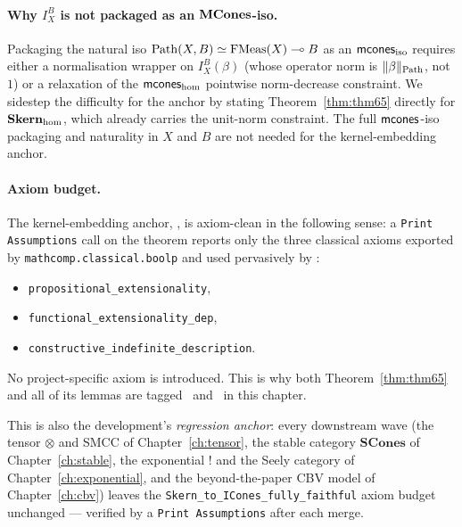 \paragraph{Why \texorpdfstring{$I^B_X$}{I^B_X} is not packaged as an \texorpdfstring{$\mathbf{MCones}$}{MCones}-iso.}
Packaging the natural iso $\mathrm{Path}(X, B) \simeq \mathrm{FMeas}(X) \multimap B$ as an
$\mathsf{mcones}_{\mathrm{iso}}$ requires either a normalisation wrapper on
$I^B_X(\beta)$ (whose operator norm is $\lVert \beta \rVert_{\mathrm{Path}}$, not
$1$) or a relaxation of the $\mathsf{mcones}_{\mathrm{hom}}$ pointwise
norm-decrease constraint. We sidestep the difficulty for the anchor by
stating Theorem~\ref{thm:thm65} directly for $\mathbf{Skern}_{\mathrm{hom}}$,
which already carries the unit-norm constraint. The full
$\mathsf{mcones}$-iso packaging and naturality in $X$ and $B$ are not needed
for the kernel-embedding anchor.

\paragraph{Axiom budget.}
The kernel-embedding anchor,
, is
axiom-clean in the following sense: a \texttt{Print Assumptions}
call on the theorem reports only the three classical axioms exported
by \texttt{mathcomp.classical.boolp} and used pervasively by
\mathcompA{}:
\begin{itemize}
  \item \texttt{propositional\_extensionality},
  \item \texttt{functional\_extensionality\_dep},
  \item \texttt{constructive\_indefinite\_description}.
\end{itemize}
No project-specific axiom is introduced. This is why both
Theorem~\ref{thm:thm65} and all of its lemmas are tagged
\rocqok\ and \mathcompok\ in this chapter.

This is also the development's \emph{regression anchor}: every
downstream wave (the tensor $\otimes$ and SMCC of
Chapter~\ref{ch:tensor}, the stable category $\mathbf{SCones}$ of
Chapter~\ref{ch:stable}, the exponential $\mathord{!}$ and the Seely
category of Chapter~\ref{ch:exponential}, and the beyond-the-paper CBV
model of Chapter~\ref{ch:cbv}) leaves the
\texttt{Skern\_to\_ICones\_fully\_faithful} axiom budget unchanged ---
verified by a \texttt{Print Assumptions} after each merge.


